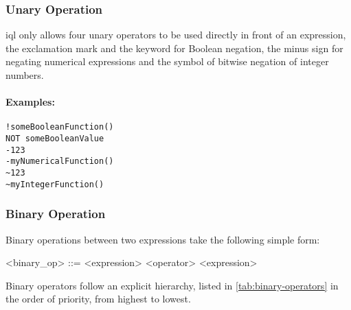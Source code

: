 \documentclass[11pt,a4paper]{article}
\begin{document}
\subsubsection{Unary Operation}
\label{sec:unary-operation}

\ac{iql} only allows four unary operators to be used directly in front of an expression, the exclamation mark \lit{!} and the  keyword for Boolean negation, the minus sign \lit{\textminus} for negating numerical expressions and the \lit{\texttildelow} symbol of bitwise negation of integer numbers.

\paragraph{Examples:}

\begin{Verbatim}[samepage=true]
!someBooleanFunction()
NOT someBooleanValue
-123
-myNumericalFunction()
~123
~myIntegerFunction()
\end{Verbatim}

\subsubsection{Binary Operation}
\label{sec:binary-operation}

Binary operations between two expressions take the following simple form:

\begin{gram}
	\label{gram:binary-operations}
	\begin{grammar}	
		<binary_op> ::= <expression> <operator> <expression>
	\end{grammar}
\end{gram}

\noindent Binary operators follow an explicit hierarchy, listed in \cref{tab:binary-operators} in the order of priority, from highest to lowest.
\end{document}
